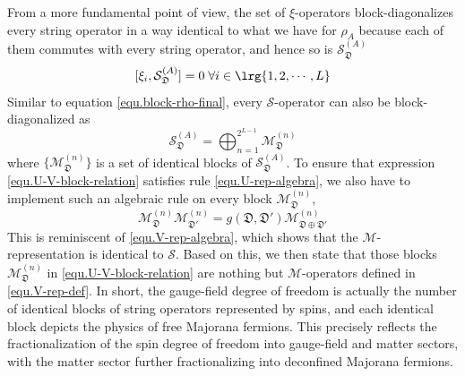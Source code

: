 From a more fundamental point of view, the set of $\xi$-operators block-diagonalizes every string operator in a way identical to what we have for $\rho_A$ because each of them commutes with every string operator, and hence so is $\mathcal{S}^{(A)}_{\mathfrak{D}}$
\[
[\xi_i,\mathcal{S}^{(A)}_{\mathfrak{D}}]=0 \;\forall i\in\lrg{1,2,\cdots,L}
\]
Similar to equation \eqref{equ.block-rho-final}, every $\mathcal{S}$-operator can also be block-diagonalized as
\begin{equation}\label{equ.U-V-block-relation}
    \mathcal{S}^{(A)}_{\mathfrak{D}} = \bigoplus_{n=1}^{2^{L-1}}\mathcal{M}^{(n)}_{\mathfrak{D}}
\end{equation}
where $\{\mathcal{M}^{(n)}_\mathfrak{D}\}$ is a set of identical blocks of $\mathcal{S}^{(A)}_{\mathfrak{D}}$. To ensure that expression \eqref{equ.U-V-block-relation} satisfies rule \eqref{equ.U-rep-algebra}, we also have to implement such an algebraic rule on every block $\mathcal{M}^{(n)}_{\mathfrak{D}}$, 
\[
\mathcal{M}^{(n)}_{\mathfrak{D}}\mathcal{M}^{(n)}_{\mathfrak{D}'} = g(\mathfrak{D},\mathfrak{D}')\mathcal{M}^{(n)}_{\mathfrak{D}\oplus\mathfrak{D}'}
\]
This is reminiscent of \eqref{equ.V-rep-algebra}, which shows that the $\mathcal{M}$-representation is identical to $\mathcal{S}$. Based on this, we then state that those blocks $\mathcal{M}^{(n)}_{\mathfrak{D}}$ in \eqref{equ.U-V-block-relation} are nothing but $\mathcal{M}$-operators defined in \eqref{equ.V-rep-def}. In short, the gauge-field degree of freedom is actually the number of identical blocks of string operators represented by spins, and each identical block depicts the physics of free Majorana fermions. This precisely reflects the fractionalization of the spin degree of freedom into gauge-field and matter sectors, with the matter sector further fractionalizing into deconfined Majorana fermions.



